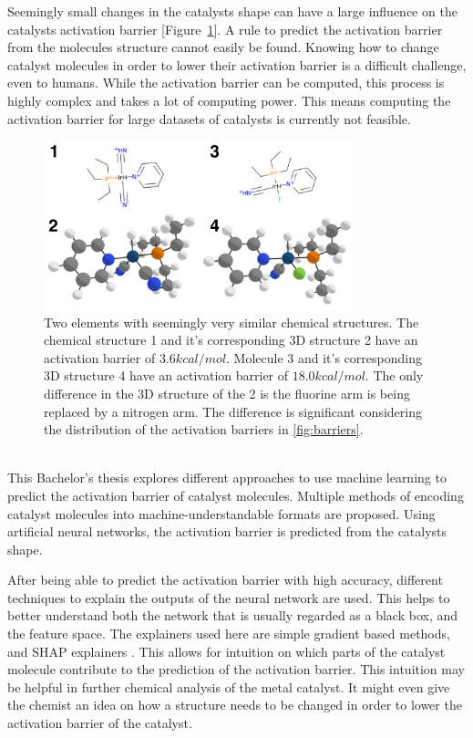Seemingly small changes in the catalysts shape can have a large influence on the catalysts activation barrier [Figure~\ref{fig:struct-diff}].
A rule to predict the activation barrier from the molecules structure cannot easily be found.  
Knowing how to change catalyst molecules in order to lower their activation barrier is a difficult challenge, even to humans.
While the activation barrier can be computed, this process is highly complex and takes a lot of computing power.
This means computing the activation barrier for large datasets of catalysts is currently not feasible.
\begin{figure}[hb!]
  \centering
  \includegraphics[width=0.8\textwidth]{figures/introduction/elems_intro.png}
  \caption[Example of catalyst molecules]{Two elements with seemingly very similar chemical structures. The chemical structure 1 and it's corresponding 3D structure 2 have an activation barrier of $3.6 kcal/mol$.
  Molecule 3 and it's corresponding 3D structure 4 have an activation barrier of $18.0 kcal/mol$.
  The only difference in the 3D structure of the 2 is the fluorine arm is being replaced by a nitrogen arm.
  The difference is significant considering the distribution of the activation barriers in \ref{fig:barriers}.  }
  \label{fig:struct-diff}
\end{figure}
\\
This Bachelor's thesis explores different approaches to use machine learning to predict the activation barrier of catalyst molecules.
Multiple methods of encoding catalyst molecules into machine-understandable formats are proposed.
Using artificial neural networks, the activation barrier is predicted from the catalysts shape.

After being able to predict the activation barrier with high accuracy, different techniques to explain the 
outputs of the neural network are used.
This helps to better understand both the network that is usually regarded as a black box, and the feature space.
The explainers used here are simple gradient based methods, and SHAP explainers \cite{NIPS2017_7062}.
This allows for intuition on which parts of the catalyst molecule contribute to the prediction of the activation barrier.
This intuition may be helpful in further chemical analysis of the metal catalyst.
It might even give the chemist an idea on how a structure needs to be changed in order to lower the activation barrier of the catalyst.
\\

